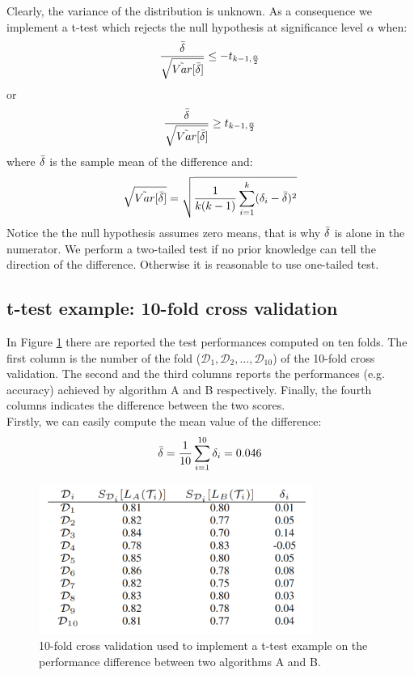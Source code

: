 Clearly, the variance of the distribution is unknown. As a consequence we
implement a t-test which rejects the null hypothesis at significance level
$\alpha$ when:
\[
	\frac{\Bar{\delta}}{\sqrt{\tilde{Var}[\Bar{\delta}]}}\leq - t_{k-1, \frac{\alpha}{2}}
\]
or
\[
	\frac{\Bar{\delta}}{\sqrt{\tilde{Var}[\Bar{\delta}]}}\geq t_{k-1, \frac{\alpha}{2}}
\]
where $\Bar{\delta}$ is the sample mean of the difference and:
\[
	\sqrt{\tilde{Var}[\Bar{\delta}]}= \sqrt{\frac{1}{k(k-1)}\sum_{i=1}^{k}(\delta_{i}-
	\Bar{\delta})^{2}}
\]
Notice the the null hypothesis assumes zero means, that is why $\Bar{\delta}$ is
alone in the numerator.
\newline
We perform a two-tailed test if no prior knowledge can tell the direction of the
difference. Otherwise it is reasonable to use one-tailed test.
\subsection{t-test example: 10-fold cross validation}
In Figure \ref{fig:tTestExample} there are reported the test performances
computed on ten folds. The first column is the number of the fold ($\mathcal{D}_{1}
, \mathcal{D}_{2}, \hdots, \mathcal{D}_{10}$) of the 10-fold cross validation.
The second and the third columns reports the performances (e.g. accuracy) achieved
by algorithm A and B respectively. Finally, the fourth columns indicates the difference
between the two scores.\\ Firstly, we can easily compute the mean value of the
difference:
\[
	\Bar{\delta}= \frac{1}{10}\sum_{i=1}^{10}\delta_{i}= 0.046
\]

\begin{figure}[H]
	\centering
	\includegraphics[width=0.8\textwidth]{
        images/06_Evaluation_tTest.png
    }
	\caption{10-fold cross validation used to implement a t-test example on the
	performance difference between two algorithms A and B.}
	\label{fig:tTestExample}
\end{figure}

